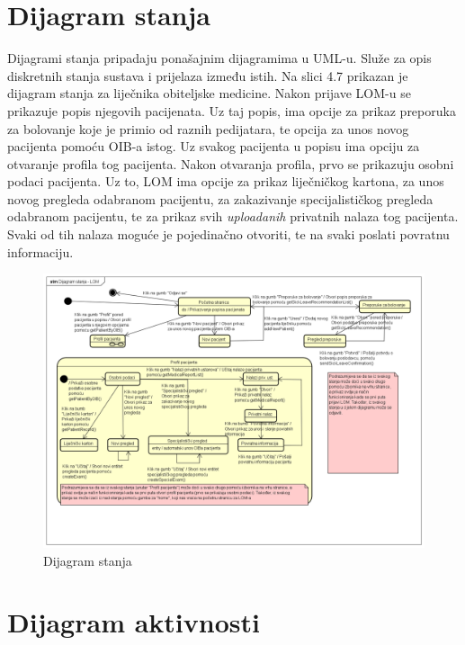 			
			
			
			\eject
		
		\section{Dijagram stanja}
			
			\text Dijagrami stanja pripadaju ponašajnim dijagramima u UML-u. Služe za opis diskretnih stanja sustava i prijelaza između istih. Na slici 4.7 prikazan je dijagram stanja za liječnika obiteljske medicine. Nakon prijave LOM-u se prikazuje popis njegovih pacijenata. Uz taj popis, ima opcije za prikaz preporuka za bolovanje koje je primio od raznih pedijatara, te opcija za unos novog pacijenta pomoću OIB-a istog. Uz svakog pacijenta u popisu ima opciju za otvaranje profila tog pacijenta. Nakon otvaranja profila, prvo se prikazuju osobni podaci pacijenta. Uz to, LOM ima opcije za prikaz liječničkog kartona, za unos novog pregleda odabranom pacijentu, za zakazivanje specijalističkog pregleda odabranom pacijentu, te za prikaz svih \textit{uploadanih} privatnih nalaza tog pacijenta. Svaki od tih nalaza moguće je pojedinačno otvoriti, te na svaki poslati povratnu informaciju. 
			
			\begin{figure}[H]
				\includegraphics[scale=0.4]{dijagrami/dijstanj1.PNG} %
				\centering
				\caption{Dijagram stanja}
				\label{fig:dijstanj1}
			\end{figure}
			
			\eject 
		
		\section{Dijagram aktivnosti}
			
